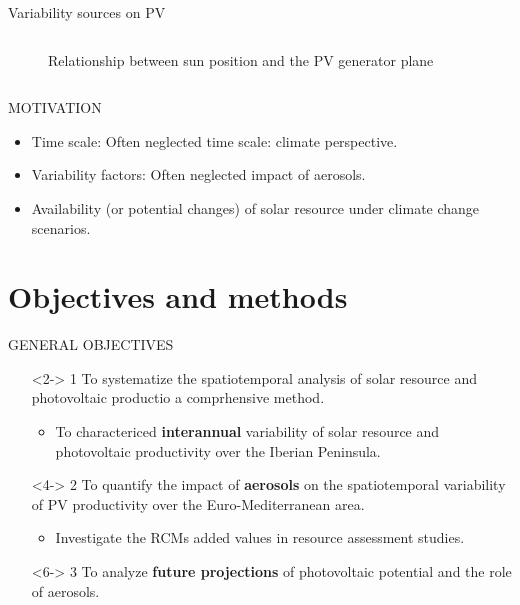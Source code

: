 \documentclass{beamer}%
\begin{document}
\begin{frame}[plain]{Variability sources on PV}
\begin{columns}
\begin{column}{0.65\textwidth}
\begin{figure}
{        \centering\caption{Relationship between sun position and the PV generator plane}}
      \end{figure}
    \end{column}
  \end{columns}
\end{frame}


\begin{frame}[fragile]{MOTIVATION}
\Large{}
\vspace{1\baselineskip}
\small{\begin{itemize}
     \item \alert{Time scale:} Often neglected time scale: climate perspective.
     \item \alert{Variability factors:} Often neglected impact of aerosols.
     \item Availability (or potential changes) of solar resource under \alert{climate change} scenarios.  
     \end{itemize}}
\end{frame}

\section{Objectives and methods}

\begin{frame}[fragile]{GENERAL OBJECTIVES}
\vspace{1\baselineskip}
\small{\begin{itemize}
  \item[]<2-> {\Huge{\alert{1}}} To systematize the spatiotemporal analysis of solar resource and photovoltaic productio \through a comprhensive method.
    \begin{itemize}
    \item<3-> To charactericed \textbf{interannual} variability of solar resource and photovoltaic productivity over the Iberian Peninsula.
      \end{itemize}
    \item[]<4-> {\Huge{\alert{2}}} To quantify the impact of \textbf{aerosols} on the spatiotemporal variability of PV productivity over the Euro-Mediterranean area.
      \begin{itemize}
      \item <5->Investigate the RCMs added values in resource assessment studies.
        \end{itemize}
  \item[]<6-> {\Huge{\alert{3}}} To analyze \textbf{future projections} of photovoltaic potential and the role of aerosols.
  \end{itemize}}
\end{frame}
\end{document}
